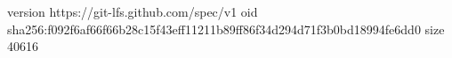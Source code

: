 version https://git-lfs.github.com/spec/v1
oid sha256:f092f6af66f66b28c15f43eff11211b89ff86f34d294d71f3b0bd18994fe6dd0
size 40616

